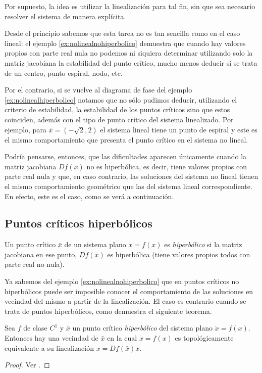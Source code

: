 Por supuesto, la idea es utilizar la linealización para tal fin, sin que sea necesario resolver el sistema de manera explícita.

Desde el principio sabemos que esta tarea no es tan sencilla como en el caso lineal: el ejemplo \ref{ex:nolinealnohiperbolico} demuestra que cuando hay valores propios con parte real nula no podemos ni siquiera determinar utilizando solo la matriz jacobiana la estabilidad del punto crítico, mucho menos deducir si se trata de un centro, punto espiral, nodo, etc.

Por el contrario, si se vuelve al diagrama de fase del ejemplo \ref{ex:nolinealhiperbolico} notamos que no sólo pudimos deducir, utilizando el criterio de estabilidad, la estabilidad de los puntos críticos sino que estos coinciden, además con el tipo de punto crítico del sistema linealizado. Por ejemplo, para $\bar{x} = (-\sqrt{2},2)$ el sistema lineal tiene un punto de espiral y este es el mismo comportamiento que presenta el punto crítico en el sistema no lineal.

Podría pensarse, entonces, que las dificultades aparecen únicamente cuando la matriz jacobiana $Df(\bar{x})$ no es hiperbólica, es decir, tiene valores propios con parte real nula y que, en caso contrario, las soluciones del sistema no lineal tienen el mismo comportamiento geométrico que las del sistema lineal correspondiente. En efecto, este es el caso, como se verá a continuación.

\subsection{Puntos críticos hiperbólicos}

\begin{definition}Un punto crítico $\bar{x}$ de un sistema plano $\dot{x} = f(x)$ es \emph{hiperbólico} si la matriz jacobiana en ese punto, $Df(\bar{x})$ es hiperbólica (tiene valores propios todos con parte real no nula).
\end{definition}

Ya sabemos del ejemplo \ref{ex:nolinealnohiperbolico} que en puntos críticos no hiperbólicos puede ser imposible conocer el comportamiento de las soluciones en vecindad del mismo a partir de la linealización. El caso es contrario cuando se trata de puntos hiperbólicos, como demuestra el siguiente teorema.

\begin{theorem} \label{teo:hartmangrobman}
Sea $f$ de clase $C^1$ y $\bar{x}$ un punto crítico \emph{hiperbólico} del sistema plano $\dot{x} = f(x)$. Entonces hay una vecindad de $\bar{x}$ en la cual $\dot{x} = f(x)$ es topológicamente equivalente a su linealización $\dot{x} = Df(\bar{x})x$.
\begin{proof}
Ver \cite[p.~136]{barrvalls}.
\end{proof}
\end{theorem}

